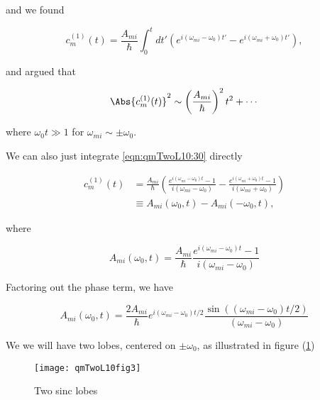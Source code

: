 and we found

\begin{equation}\label{eqn:qmTwoL10:30}
c_m^{(1)}(t) = \frac{A_{mi}}{\hbar} \int_0^t dt' \left( 
e^{i (\omega_{mi} - \omega_0) t'} 
-
e^{i (\omega_{mi} + \omega_0) t'} 
\right),
\end{equation}

and argued that 

\begin{equation}\label{eqn:qmTwoL10:50}
\Abs{ c_m^{(1)}(t) }^2  \sim \left( \frac{A_{mi}}{\hbar} \right)^2 t^2 + \cdots
\end{equation}

where $\omega_0 t \gg 1$ for $\omega_{mi} \sim \pm \omega_0$.

We can also just integrate \ref{eqn:qmTwoL10:30} directly

\begin{equation}\label{eqn:qmTwoL10:30b}
\begin{aligned}
c_m^{(1)}(t) 
&= 
\frac{A_{mi}}{\hbar} \left( 
\frac{e^{i (\omega_{mi} - \omega_0) t} - 1}
{ i (\omega_{mi} - \omega_0) }
-
\frac{e^{i (\omega_{mi} + \omega_0) t} - 1}{ i (\omega_{mi} + \omega_0) }
\right) \\
&\equiv 
A_{mi}(\omega_0, t) - A_{mi}(-\omega_0, t),
\end{aligned}
\end{equation}

where 

\begin{equation}\label{eqn:qmTwoL10:n}
A_{mi}(\omega_0, t) =
\frac{A_{mi}}{\hbar} 
\frac{e^{i (\omega_{mi} - \omega_0) t} - 1}
{ i (\omega_{mi} - \omega_0) }
\end{equation}

Factoring out the phase term, we have

\begin{equation}\label{eqn:qmTwoL10:n}
A_{mi}(\omega_0, t) =
\frac{2 A_{mi}}{\hbar} 
e^{i (\omega_{mi} - \omega_0) t/2}
\frac{
\sin(
(\omega_{mi} - \omega_0) t/2
)
}
{ (\omega_{mi} - \omega_0) }
\end{equation}

We we will have two lobes, centered on $\pm \omega_0$, as illustrated in figure (\ref{fig:qmTwoL10:qmTwoL10fig3})
\begin{figure}[htp]
   \centering
   \texttt{[image: qmTwoL10fig3]}
   \caption{Two sinc lobes}\label{fig:qmTwoL10:qmTwoL10fig3}
\end{figure}

